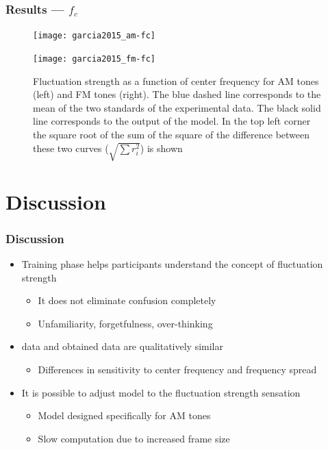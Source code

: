 \documentclass{beamer}
\begin{document}
\begin{frame}
  \frametitle{Results --- $f_c$}
  \begin{figure}
    \centering
    \begin{minipage}{0.45\textwidth}
      \texttt{[image: garcia2015\_am-fc]}
    \end{minipage}
    \hfill
    \begin{minipage}{0.45\textwidth}
      \texttt{[image: garcia2015\_fm-fc]}
    \end{minipage}
    \caption{Fluctuation strength as a function of center frequency for
      AM tones (left) and FM tones (right). The blue dashed line corresponds to
      the mean of the two standards of the experimental data. The black solid
      line corresponds to the output of the model. In the top left corner the
      square root of the sum of the square of the difference between these two
      curves ($\sqrt{\sum r_i^2}$) is shown}
  \end{figure}
\end{frame}

\section{Discussion}
\begin{frame}
  \frametitle{Discussion}
  \begin{itemize}
    \item<1-> Training phase helps participants understand the concept of
      fluctuation strength
    \begin{itemize}
      \item<2-> It does not eliminate confusion completely
      \item<3-> Unfamiliarity, forgetfulness, over-thinking
    \end{itemize}
    \item<4-> \citeauthor{Fastl2007Psychoacoustics} data and obtained data are
      qualitatively similar
    \begin{itemize}
      \item<5-> Differences in sensitivity to center frequency and frequency
        spread
    \end{itemize}
    \item<6-> It is possible to adjust \citeauthor{daniel1997psychoacoustical}
      model to the fluctuation strength sensation
    \begin{itemize}
      \item<7-> Model designed specifically for AM tones
      \item<8-> Slow computation due to increased frame size
    \end{itemize}
  \end{itemize}
\end{frame}
\end{document}
